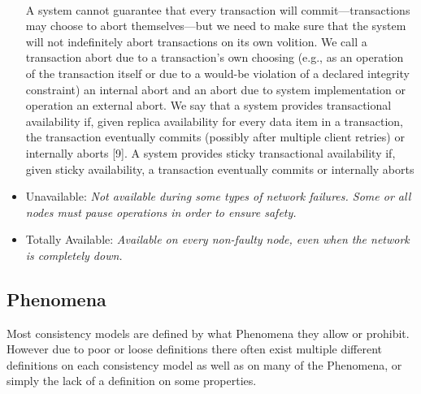 \documentclass[a4paper,10pt,titlepage]{report}
\begin{document}
\begin{itemize}
{     \vspace*{4mm}\\
    A system cannot guarantee that every transaction will commit—transactions may choose to abort themselves—but we need to make    sure that the system will not indefinitely abort transactions on its    own volition. We call a transaction abort due to a transaction's own    choosing (e.g., as an operation of the transaction itself or due to    a would-be violation of a declared integrity constraint) an internal    abort and an abort due to system implementation or operation an    external abort. We say that a system provides transactional availability if, given replica availability for every data item in a transaction, the transaction eventually commits (possibly after multiple    client retries) or internally aborts [9]. A system provides sticky    transactional availability if, given sticky availability, a transaction eventually commits or internally aborts}\cite{HighlyAvailableTransactionsVirtuesandLimitations}

        \item Unavailable: \textit{Not available during some types of network failures. Some or all nodes must pause operations in order to ensure safety.}
        \item Totally Available: \textit{Available on every non-faulty node, even when the network is completely down.}


    \end{itemize}

    \subsection{Phenomena}
    Most consistency models are defined by what Phenomena they allow or prohibit. However due to poor or loose definitions there often exist multiple different definitions on each consistency model as well as on many of the Phenomena, or simply the lack of a definition on some properties.

\end{document}
